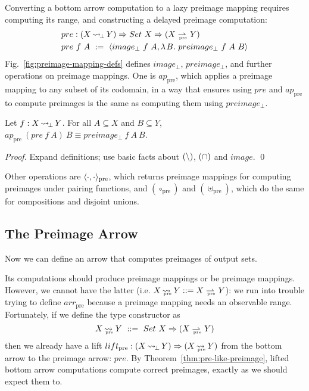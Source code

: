 \documentclass{llncs}
\newcommand{\figref}[1]{Fig.~\ref{#1}}
\newcommand{\arrow}{\rightsquigarrow}
\newcommand{\pto}{\rightharpoonup}
\newcommand{\arrowlift}{\ensuremath{lift}}
\newcommand{\arrowarr}{\ensuremath{arr}}
\DeclareMathOperator{\botto}{\arrow_{\mspace{-3mu}\bot}}
\newcommand{\pre}{_\mathrm{pre}}
\DeclareMathOperator{\preto}{\arrow_{\mspace{-19mu}\pre}}
\newcommand{\liftpre}{\arrowlift\pre}
\newcommand{\arrpre}{\arrowarr\pre}
\newcommand{\prepto}{\pto_{\mspace{-19mu}\pre}}
\begin{document}
Converting a bottom arrow computation to a lazy preimage mapping requires computing its range, and constructing a delayed preimage computation:
\begin{equation}
\begin{aligned}
	&pre : (X \botto Y) \tto Set~X \tto (X \prepto Y) \\
	&pre~f~A \ := \ \pair{image_\bot~f~A,\fun{B}{preimage_\bot~f~A~B}}
\end{aligned}
\end{equation}
\figref{fig:preimage-mapping-defs} defines $image_\bot$, $preimage_\bot$, and further operations on preimage mappings.
One is $ap\pre$, which applies a preimage mapping to any subset of its codomain, in a way that ensures using $pre$ and $ap\pre$ to compute preimages is the same as computing them using $preimage_\bot$.

\begin{theorem}[$ap\pre$ computes preimages]
\label{thm:pre-like-preimage}
Let $f : X \botto Y$. For all $A \subseteq X$ and $B \subseteq Y$, $ap\pre~(pre~f~A)~B \equiv preimage_\bot~f~A~B$.
\end{theorem}
\begin{proof}
Expand definitions; use basic facts about $(\backslash)$, $(\cap)$ and $image$.
\qed
\end{proof}

Other operations are $\pair{\cdot,\cdot}\pre$, which returns preimage mappings for computing preimages under pairing functions, and $(\circ\pre)$ and $(\uplus\pre)$, which do the same for compositions and disjoint unions.

\subsection{The Preimage Arrow}
\label{sec:preimage-arrow}

Now we can define an arrow that computes preimages of output sets.

Its computations should produce preimage mappings or be preimage mappings.
However, we cannot have the latter (i.e. $X \preto Y ::= X \prepto Y$): we run into trouble trying to define $\arrpre$ because a preimage mapping needs an observable range.
Fortunately, if we define the  type constructor as
\begin{equation}
	X \preto Y \ ::= \ Set~X \tto (X \prepto Y)
\end{equation}
then we already have a lift $\liftpre : (X \botto Y) \tto (X \preto Y)$ from the bottom arrow to the preimage arrow: $pre$.
By Theorem~\ref{thm:pre-like-preimage}, lifted bottom arrow computations compute correct preimages, exactly as we should expect them to.
\end{document}
